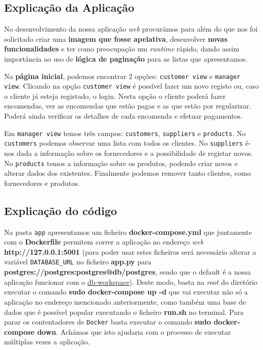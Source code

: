 \documentclass[12pt,a4paper]{article}
\begin{document}
\subsection*{Explicação da Aplicação}

No desenvolvimento da nossa aplicação \textit{web} procurámos para além do que nos foi solicitado criar uma \textbf{imagem que fosse apelativa}, desenvolver
\textbf{novas funcionalidades} e ter como preocupação um \textit{runtime} rápido, dando assim importância ao uso de \textbf{lógica de paginação} para as listas que apresentamos.

Na \textbf{página inicial}, podemos encontrar 2 opções: \texttt{customer view} e \texttt{manager view}.
Clicando na opção \texttt{customer view} é possível fazer um novo registo ou, caso o cliente já esteja registado, o login.
Nesta opção o cliente poderá fazer encomendas, ver as encomendas que estão pagas e as que estão por regularizar.
Poderá ainda verificar os detalhes de cada encomenda e efetuar pagamentos.

Em \texttt{manager view} temos três campos: \texttt{customers}, \texttt{suppliers} e \texttt{products}.
No \texttt{customers} podemos observar uma lista com todos os clientes.
No \texttt{suppliers} é-nos dada a informação sobre os fornecedores e a possibilidade de registar novos.
No \texttt{products} temos a informação sobre os produtos, podendo criar novos e alterar dados dos existentes.
Finalmente podemos remover tanto clientes, como fornecedores e produtos.

\subsection*{Explicação do código}

Na pasta \texttt{app} apresentamos um ficheiro \textbf{docker-compose.yml} que juntamente
com o \textbf{Dockerfile} permitem correr a aplicação no endereço \textit{web} \textbf{http://127.0.0.1:5001}
(para poder usar estes ficheiros será necessário alterar a variável \texttt{DATABASE\_URL} no ficheiro \textbf{app.py}
para \textbf{postgres://postgres:postgres@db/postgres}, sendo que o default é a nossa aplicação funcionar com
o \href{https://github.com/bdist/db-workspace/}{db-workspace}).
Deste modo, basta na \textit{root} do diretório executar o comando \textbf{sudo docker-compose up -d}
que vai executar não só a aplicação no endereço mencionado anteriormente, como também uma base de dados
que é possível popular executando o ficheiro \textbf{run.sh} no terminal. Para parar os contentadores de \texttt{Docker}
basta executar o comando \textbf{sudo docker-compose down}. Achámos que isto ajudaria com o processo
de executar múltiplas vezes a aplicação.
\end{document}
